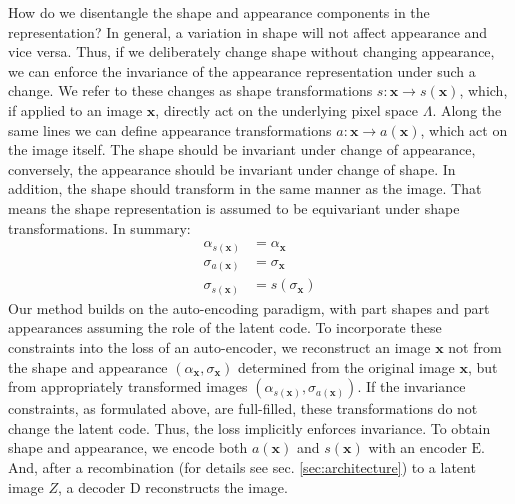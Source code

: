 	How do we disentangle the shape and appearance components in the representation? In general, a variation in shape will not affect appearance and vice versa. Thus, if we deliberately change shape without changing appearance, we can enforce the invariance of the appearance representation under such a change.
	We refer to these changes as shape transformations $s: \mathbf{x} \rightarrow s(\mathbf{x})$, which, if applied to an image $\mathbf{x}$, directly act on the underlying pixel space $\Lambda$.
	Along the same lines we can define appearance transformations $a: \mathbf{x} \rightarrow a(\mathbf{x})$, which act on the image itself.
	The shape should be invariant under change of appearance, conversely, the appearance should be invariant under change of shape.
	In addition, the shape should transform in the same manner as the image.
	That means the shape representation is assumed to be equivariant under shape transformations.
	In summary:
	\begin{align}
		{\alpha}_{s(\mathbf{x})}  &= {\alpha}_{\mathbf{x}} \tag{invariance of appearance}\\
		{\sigma}_{a(\mathbf{x})} &= {\sigma}_{\mathbf{x}}  \tag{invariance of shape}\\
		{\sigma}_{s(\mathbf{x})} &= s({\sigma}_{\mathbf{x}}) \tag{equivariance of shape}
	\label{eq:invar}
	\end{align} %
	Our method builds on the auto-encoding paradigm, with part shapes and part appearances assuming the role of the latent code.
	To incorporate these constraints into the loss of an auto-encoder, we reconstruct an image $\mathbf{x}$ not from the shape and appearance $({\alpha}_\mathbf{x}, {\sigma}_\mathbf{x})$ determined from the original image $\mathbf{x}$, but from appropriately transformed images $({\alpha}_{s(\mathbf{x})}, {\sigma}_{a(\mathbf{x})})$.
	If the invariance constraints, as formulated above, are full-filled, these transformations do not change the latent code.
	Thus, the loss implicitly enforces invariance.
	To obtain shape and appearance, we encode both $a(\mathbf{x})$ and $s(\mathbf{x})$ with an encoder $\mathrm{E}$.
	And, after a recombination (for details see sec. \ref{sec:architecture}) to a latent image $Z$, a decoder $\mathrm{D}$ reconstructs the image.
